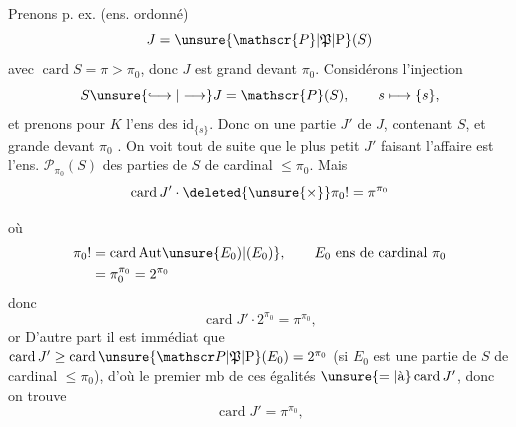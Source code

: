 Prenons p. ex.  (ens. ordonné)
\[
J=\unsure{\mathscr{P}|\mathfrak{P}|\mathrm{P}}(S)
\]
avec $\operatorname{card}S=\pi>\pi_0$, donc $J$ est grand devant $\pi_0$. Considérons l'injection
\[
S\unsure{\lhook\joinrel\longrightarrow|\longrightarrow}J=\mathscr{P}(S),\qquad s\longmapsto\{s\},
\]
et prenons pour $K$  l'ens des $\mathrm{id}_{\{s\}}$. Donc on  une partie $J'$ de $J$, contenant $S$, et grande devant $\pi_0$ . On voit tout de suite que le plus petit $J'$ faisant l'affaire est l'ens. $\mathscr{P}_{\pi_0}(S)$ des parties de $S$ de cardinal $\leq\pi_0$. Mais  
\[
\operatorname{card}J'\cdot\deleted{\unsure{\times}}\pi_0!=\pi^{\pi_0}
\]

où
\[
\begin{aligned}
\pi_0!&=\operatorname{card}\mathrm{Aut}\unsure{E_0)|(E_0)},\qquad E_0\text{ ens de cardinal }\pi_0\\
&=\pi_0^{\pi_0}=2^{\pi_0}
\end{aligned}
\]
donc
\[
\operatorname{card}J'\cdot2^{\pi_0}=\pi^{\pi_0},
\]
or
D'autre part il est immédiat que $\operatorname{card}J'\geq\operatorname{card}\unsure{\mathscr P|\mathfrak P|\mathrm P}(E_0)=2^{\pi_0}$ (si $E_0$ est une partie de $S$ de cardinal $\leq\pi_0$), d'où le  premier mb de ces égalités $\unsure{=|\text{à}}\operatorname{card}J'$, donc on trouve
\[
\operatorname{card}J'=\pi^{\pi_0},
\]

